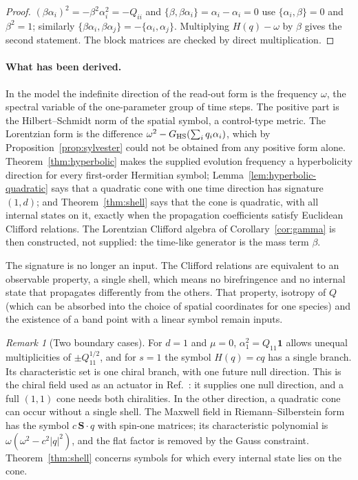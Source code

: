 \documentclass[12pt]{article}
\theoremstyle{definition}
\theoremstyle{remark}
\newtheorem{remark}[theorem]{Remark}
\begin{document}
\begin{proof}
$(\beta\alpha_i)^2=-\beta^2\alpha_i^2=-Q_{ii}$ and $\{\beta,\beta\alpha_i\}=\alpha_i-\alpha_i=0$ use $\{\alpha_i,\beta\}=0$ and $\beta^2=1$; similarly $\{\beta\alpha_i,\beta\alpha_j\}=-\{\alpha_i,\alpha_j\}$. Multiplying $H(q)-\omega$ by $\beta$ gives the second statement. The block matrices are checked by direct multiplication.
\end{proof}

\paragraph{What has been derived.} In the model the indefinite direction of the read-out form is the frequency $\omega$, the spectral variable of the one-parameter group of time steps. The positive part is the Hilbert--Schmidt norm of the spatial symbol, a control-type metric. The Lorentzian form is the difference $\omega^2-G_{\rm HS}(\sum_iq_i\alpha_i)$, which by Proposition~\ref{prop:sylvester} could not be obtained from any positive form alone. Theorem~\ref{thm:hyperbolic} makes the supplied evolution frequency a hyperbolicity direction for every first-order Hermitian symbol; Lemma~\ref{lem:hyperbolic-quadratic} says that a quadratic cone with one time direction has signature $(1,d)$; and Theorem~\ref{thm:shell} says that the cone is quadratic, with all internal states on it, exactly when the propagation coefficients satisfy Euclidean Clifford relations. The Lorentzian Clifford algebra of Corollary~\ref{cor:gamma} is then constructed, not supplied: the time-like generator is the mass term $\beta$.

The signature is no longer an input. The Clifford relations are equivalent to an observable property, a single shell, which means no birefringence and no internal state that propagates differently from the others. That property, isotropy of $Q$ (which can be absorbed into the choice of spatial coordinates for one species) and the existence of a band point with a linear symbol remain inputs.

\begin{remark}[Two boundary cases]
\label{rem:boundary}
For $d=1$ and $\mu=0$, $\alpha_1^2=Q_{11}\mathbf 1$ allows unequal multiplicities of $\pm Q_{11}^{1/2}$, and for $s=1$ the symbol $H(q)=cq$ has a single branch. Its characteristic set is one chiral branch, with one future null direction. This is the chiral field used as an actuator in Ref.~\cite{Liu2026QRAIF_B}: it supplies one null direction, and a full $(1,1)$ cone needs both chiralities. In the other direction, a quadratic cone can occur without a single shell. The Maxwell field in Riemann--Silberstein form has the symbol $c\,\mathbf S\cdot q$ with spin-one matrices; its characteristic polynomial is $\omega(\omega^2-c^2|q|^2)$, and the flat factor is removed by the Gauss constraint. Theorem~\ref{thm:shell} concerns symbols for which every internal state lies on the cone.
\end{remark}
\end{document}
